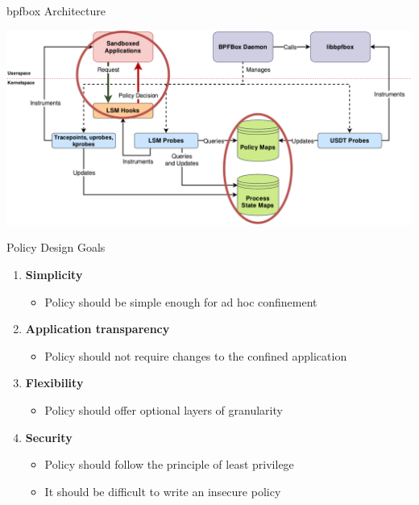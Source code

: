 \documentclass[12pt, dvipsnames, aspectratio=169]{beamer}
\begin{document}
\begin{frame}[c, noframenumbering]{bpfbox Architecture}
\begin{center}
    \color{black}
    \vspace{0.5em}
    \includegraphics[width=1\textwidth]{figs/bpfbox-overview-4.pdf}
\end{center}
\end{frame}

\begin{frame}[c]{Policy Design Goals}
\begin{enumerate}
    \item \textbf{Simplicity}
    \begin{itemize}
        \item Policy should be simple enough for ad hoc confinement
    \end{itemize}
    \vfill
    \item \textbf{Application transparency}
    \begin{itemize}
        \item Policy should not require changes to the confined application
    \end{itemize}
    \vfill
    \item \textbf{Flexibility}
    \begin{itemize}
        \item Policy should offer optional layers of granularity
    \end{itemize}
    \vfill
    \item \textbf{Security}
    \begin{itemize}
        \item Policy should follow the principle of least privilege
        \item It should be difficult to write an insecure policy
    \end{itemize}
\end{enumerate}
\end{frame}
\end{document}
